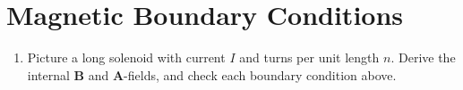 \documentclass[12pt]{article}
\begin{document}
\section{Magnetic Boundary Conditions}

\begin{enumerate}
\item Picture a long solenoid with current $I$ and turns per unit length $n$.  Derive the internal $\mathbf{B}$ and $\mathbf{A}$-fields, and check each boundary condition above.
\end{enumerate}
\end{document}
